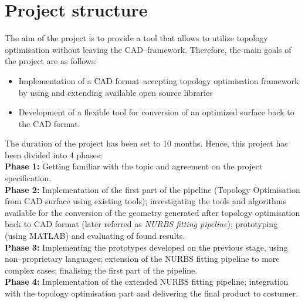 \section{Project structure}
The aim of the project is to provide a tool that allows to utilize topology optimisation without leaving the CAD--framework. Therefore, the main goals of the project are as follows:
\begin{itemize}
\item Implementation of a CAD format--accepting topology optimisation framework by using and extending available open source libraries
\item Development of a flexible tool for conversion of an optimized surface back to the CAD format.
\end{itemize}

The duration of the project has been set to 10 months. Hence, this project has been divided into 4 phases:\\

\textbf{Phase 1:} Getting familiar with the topic and agreement on the project specification.\\

\textbf{Phase 2:} Implementation of the first part of the pipeline (Topology Optimisation from CAD surface using existing tools); investigating the tools and algorithms available for the conversion of the geometry generated after topology optimisation back to CAD format (later referred as \emph{NURBS fitting pipeline}); prototyping (using MATLAB) and evaluating of found results.\\

\textbf{Phase 3:} Implementing the prototypes developed on the previous stage, using non--proprietary languages; extension of the NURBS fitting pipeline to more complex cases; finalising the first part of the pipeline.\\

\textbf{Phase 4:} Implementation of the extended NURBS fitting pipeline; integration with the topology optimisation part and delivering the final product to costumer.


